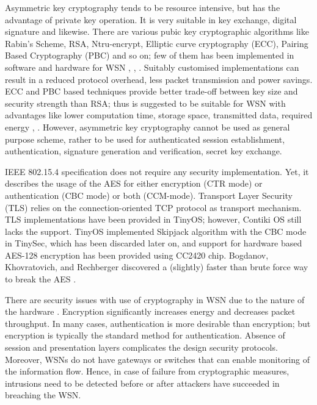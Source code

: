 \documentclass[conference,final]{IEEEtran}
\newcommand{\todo}[1]{\pdfmarkupcomment[markup=Highlight,color=red]{#1}{todo}}
\begin{document}
Asymmetric key cryptography tends to be resource intensive, but has the advantage of private key operation.
It is very suitable in key exchange, digital signature and likewise. 
There are various pubic key cryptographic algorithms like Rabin's Scheme,  RSA, Ntru-encrypt, Elliptic curve cryptography (ECC), Pairing Based Cryptography (PBC) and so on; few of them has been implemented in software and hardware for WSN \cite{ISI:000290947700017}, \cite{ISI:000312683300029}, \cite{ISI:000328624800002}. %
Suitably customised implementations can result in a reduced protocol overhead, less packet transmission and power savings.
ECC and PBC based techniques provide better trade-off  between  key size and security strength than RSA; thus is suggested to be suitable for WSN with advantages like lower computation time, storage space, transmitted data, required energy \cite{Liu:2008:TCL:1371607.1372738}, \cite{Oliveira:2011:TPA:1930560.1931219}. %
However, asymmetric key cryptography  cannot be used as general purpose scheme, rather to be used for authenticated session establishment, authentication, signature generation and verification, secret key exchange.

IEEE 802.15.4 specification does not require any security implementation. 
Yet, it describes the usage of the AES for either encryption (CTR mode) or authentication (CBC mode) or both (CCM-mode).
Transport Layer Security (TLS) relies on the connection-oriented TCP protocol as transport mechanism.  
TLS implementations have been provided in TinyOS; however, Contiki OS still lacks the support. \todo{NEED TO CHECK Contiki ASSERTION}
TinyOS implemented Skipjack algorithm with the CBC mode in TinySec, which has been discarded later on, and support for  hardware based AES-128 encryption has been provided using CC2420 chip.
Bogdanov, Khovratovich, and Rechberger   discovered a (slightly) faster than brute force way to break the AES \cite{ISI:000308844100019}.  %

There are security issues with use of cryptography in WSN due to the nature of the hardware \cite{1710}.
Encryption significantly increases energy and decreases packet throughput.
In many cases, authentication is more desirable than encryption; but encryption is typically the standard method for authentication.
Absence of session and presentation layers complicates the design security protocols.  %
Moreover, WSNs do not have gateways or switches that can enable monitoring of the information flow.
Hence, in case of failure from cryptographic measures, intrusions need to be detected before or after attackers have succeeded in breaching the WSN. 
\end{document}
